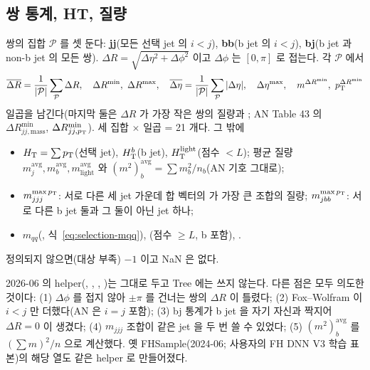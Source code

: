\subsection{쌍 통계, HT, 질량}
쌍의 집합 $\mathcal P$ 를 셋 둔다: \textbf{jj}(모든 선택 jet 의 $i<j$), \textbf{bb}(b jet 의 $i<j$), \textbf{bj}(b jet 과 non-b jet 의 모든 쌍).
$\Delta R=\sqrt{\Delta\eta^2+\Delta\phi^2}$ 이고 $\Delta\phi$ 는 $[0,\pi]$ 로 접는다. 각 $\mathcal P$ 에서
\begin{equation}
\overline{\Delta R}=\frac1{|\mathcal P|}\sum_{\mathcal P}\Delta R,\quad \Delta R^{\min},\ \Delta R^{\max},\quad
\overline{\Delta\eta}=\frac1{|\mathcal P|}\sum_{\mathcal P}|\Delta\eta|,\quad \Delta\eta^{\max},\quad
m^{\Delta R^{\min}},\ p_{\mathrm{T}}^{\Delta R^{\min}}
\label{eq:reco-pairs}
\end{equation}
일곱을 남긴다(마지막 둘은 $\Delta R$ 가 가장 작은 쌍의 질량과 \pt; AN Table 43 의 $\Delta R^{\min}_{jj,\text{mass}}$, $\Delta R^{\min}_{jj,p_{\mathrm{T}}}$).
세 집합 $\times$ 일곱 = 21 개다. 그 밖에
\begin{itemize}
\item $H_{\mathrm{T}}=\sum p_{\mathrm{T}}$(선택 jet), $H_{\mathrm{T}}^b$(b jet), $H_{\mathrm{T}}^{\text{light}}$(점수 $<L$); 평균 질량 $m_j^{\text{avg}}, m_b^{\text{avg}}, m_{\text{light}}^{\text{avg}}$ 와
      $(m^2)_b^{\text{avg}}=\sum m_b^2/n_b$(AN 기호 그대로);
\item $m_{jjj}^{\max p_{\mathrm{T}}}$: 서로 다른 세 jet 가운데 합 벡터의 \pt{} 가 가장 큰 조합의 질량; $m_{jbb}^{\max p_{\mathrm{T}}}$: 서로 다른 b jet 둘과 그 둘이 아닌 jet 하나;
\item $m_{qq}$(, 식~\eqref{eq:selection-mqq}), (점수 $\ge L$, b 포함), .
\end{itemize}
정의되지 않으면(대상 부족) $-1$ 이고 NaN 은 없다.

\begin{andiff}
2026-06 의  helper(, , , )는 그대로 두고 Tree 에는 쓰지 않는다.
다른 점은 모두 의도한 것이다: (1) $\Delta\phi$ 를 접지 않아 $\pm\pi$ 를 건너는 쌍의 $\Delta R$ 이 틀렸다;
(2) Fox–Wolfram 이 $i<j$ 만 더했다(AN 은 $i=j$ 포함); (3) bj 통계가 b jet 을 자기 자신과 짝지어 $\Delta R=0$ 이 생겼다; (4) $m_{jjj}$ 조합이 같은 jet 을
두 번 쓸 수 있었다; (5) $(m^2)_b^{\text{avg}}$ 를 $(\sum m)^2/n$ 으로 계산했다. 옛 FHSample(2024-06; 사용자의 FH DNN V3 학습 표본)의 해당 열도
같은 helper 로 만들어졌다.
\end{andiff}

